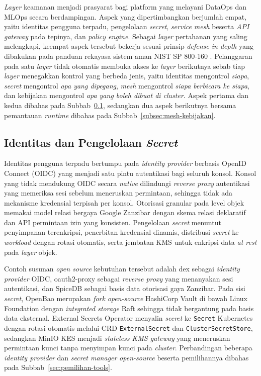 \textit{Layer} keamanan menjadi prasyarat bagi platform yang melayani DataOps dan MLOps secara berdampingan. Aspek yang dipertimbangkan berjumlah empat, yaitu identitas pengguna terpadu, pengelolaan \textit{secret}, \textit{service mesh} beserta \textit{API gateway} pada tepinya, dan \textit{policy engine}. Sebagai \textit{layer} pertahanan yang saling melengkapi, keempat aspek tersebut bekerja sesuai prinsip \textit{defense in depth} yang dibakukan pada panduan rekayasa sistem aman NIST SP 800-160 \autocite{ross2022engineering}. Pelanggaran pada satu \textit{layer} tidak otomatis membuka akses ke \textit{layer} berikutnya sebab tiap \textit{layer} menegakkan kontrol yang berbeda jenis, yaitu identitas mengontrol \textit{siapa}, \textit{secret} mengontrol \textit{apa yang dipegang}, \textit{mesh} mengontrol \textit{siapa berbicara ke siapa}, dan kebijakan mengontrol \textit{apa yang boleh dibuat di cluster}. Aspek pertama dan kedua dibahas pada Subbab~\ref{subsec:identitas-rahasia}, sedangkan dua aspek berikutnya bersama pemantauan \textit{runtime} dibahas pada Subbab~\ref{subsec:mesh-kebijakan}.

\subsection{Identitas dan Pengelolaan \textit{Secret}}
\label{subsec:identitas-rahasia}

Identitas pengguna terpadu bertumpu pada \textit{identity provider} berbasis OpenID Connect (OIDC) yang menjadi satu pintu autentikasi bagi seluruh konsol. Konsol yang tidak mendukung OIDC secara \textit{native} dilindungi \textit{reverse proxy} autentikasi yang memeriksa sesi sebelum meneruskan permintaan, sehingga tidak ada mekanisme kredensial terpisah per konsol. Otorisasi granular pada level objek memakai model relasi bergaya Google Zanzibar dengan skema relasi deklaratif dan API permintaan izin yang konsisten. Pengelolaan \textit{secret} menuntut penyimpanan terenkripsi, penerbitan kredensial dinamis, distribusi \textit{secret} ke \textit{workload} dengan rotasi otomatis, serta jembatan KMS untuk enkripsi data \textit{at rest} pada \textit{layer} objek.

Contoh susunan \textit{open source} kebutuhan tersebut adalah dex \autocite{dex2025} sebagai \textit{identity provider} OIDC, oauth2-proxy \autocite{oauth2proxy2025} sebagai \textit{reverse proxy} yang menanyakan sesi autentikasi, dan SpiceDB \autocite{spicedb2025} sebagai basis data otorisasi gaya Zanzibar. Pada sisi \textit{secret}, OpenBao \autocite{openbao2025} merupakan \textit{fork} \textit{open-source} HashiCorp Vault di bawah Linux Foundation dengan \textit{integrated storage} Raft sehingga tidak bergantung pada basis data eksternal. External Secrets Operator \autocite{externalsecrets2025} menyalin \textit{secret} ke \texttt{Secret} Kubernetes dengan rotasi otomatis melalui CRD \texttt{ExternalSecret} dan \texttt{ClusterSecretStore}, sedangkan MinIO KES \autocite{kes2025} menjadi \textit{stateless KMS gateway} yang meneruskan permintaan kunci tanpa menyimpan kunci pada \textit{cluster}. Perbandingan beberapa \textit{identity provider} dan \textit{secret manager} \textit{open-source} beserta pemilihannya dibahas pada Subbab~\ref{sec:pemilihan-tools}.


